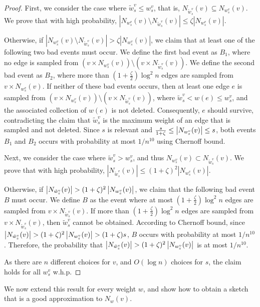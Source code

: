 \documentclass{article}
\begin{document}
\begin{proof}
First, we consider the case where \(\tilde{w}^v_s \leq w^v_s\), that is, \(N_{\tilde{w}^v_s}(v) \subseteq N_{w^v_s}(v)\). We prove that with high probability, \(|N_{w^v_s}(v) \setminus N_{\tilde{w}^v_s}(v)| \leq \zeta |N_{w^v_s}(v)|\). 

Otherwise, if \(|N_{w^v_s}(v) \setminus N_{\tilde{w}^v_s}(v)| > \zeta |N_{w^v_s}(v)|\), we claim that at least one of the following two bad events must occur. 
We define the first bad event as \(B_1\), where no edge is sampled from \((v\times N_{w^v_s}(v)) \setminus (v\times N_{\tilde{w}^v_s}(v))\). We define the second bad event as \(B_2\), where more than \((1+\frac{\zeta}{2}) \log^2 n\) edges are sampled from \(v\times N_{w^v_s}(v)\). If neither of these bad events occurs, then at least one edge \(e\) is sampled from \((v\times N_{w^v_s}(v) )\setminus (v\times N_{\tilde{w}^v_s}(v))\), where \(\tilde{w}^v_s < w(e) \le w^v_s\), and the associated collection of $w(e)$ is not deleted. Consequently, \(e\) should survive, contradicting the claim that \(\tilde{w}^v_s\) is the maximum weight of an edge that is sampled and not deleted. Since $s$ is relevant and $\frac{s}{1+\zeta} \leq \left|N_{w^v_s}(v)\right| \leq s$, both events $B_1$ and $B_2$ occurs with probability at most \(1/n^{10}\) using Chernoff bound.

Next, we consider the case where \(\tilde{w}^v_s > w^v_s\), and thus \(N_{w^v_s}(v) \subset N_{\tilde{w}^v_s}(v)\). We prove that with high probability, \(|N_{\tilde{w}^v_s}(v)| \leq (1+\zeta)^2|N_{w^v_s}(v)|\).

Otherwise, if \(\left|N_{\tilde{w}^v_s}(v)\right| > (1+\zeta)^2 \left|N_{w^v_s}(v)\right|\), we claim that the following bad event \(B\) must occur. We define \(B\) as the event where at most \((1+\frac{\zeta}{2}) \log^2 n\) edges are sampled from \(v\times N_{\tilde{w}^v_s}(v)\). If more than \( (1+\frac{\zeta}{2}) \log^2 n\) edges are sampled from \(v\times N_{\tilde{w}^v_s}(v)\), then $\tilde{w}^v_s$ cannot be obtained. According to Chernoff bound, since \(\left|N_{\tilde{w}^v_s}(v)\right| > (1+\zeta)^2 \left|N_{w^v_s}(v)\right| > (1+\zeta)s\), \(B\) occurs with probability at most \(1/n^{10}\). Therefore, the probability that \(\left|N_{\tilde{w}^v_s}(v)\right| > (1+\zeta)^2 \left|N_{w^v_s}(v)\right|\) is at most \(1/n^{10}\).

As there are $n$ different choices for $v$, and $O(\log n)$ choices for $s$, the claim holds for all $w^v_s$ w.h.p. 
\end{proof}

We now extend this result for every weight $w$, and show how to obtain a sketch that is a good approximation to $N_w(v)$.
\end{document}
